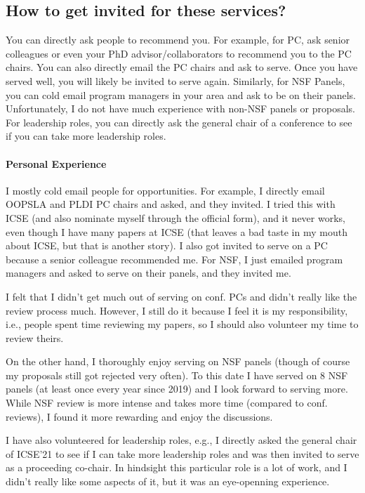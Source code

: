\documentclass[oneside,11pt,dvipsnames]{book}
\begin{document}
\subsection{How to get invited for these services?} 

You can directly ask people to recommend you. For example, for PC, ask senior colleagues or even your PhD advisor/collaborators to recommend you to the PC chairs. You can also directly email the PC chairs and ask to serve.  Once you have served well, you will likely be invited to serve again.  
Similarly, for NSF Panels, you can cold email program managers in your area and ask to be on their panels.  Unfortunately, I do not have much experience with non-NSF panels or proposals. For leadership roles, you can directly ask the general chair of a conference to see if you can take more leadership roles.

\paragraph{Personal Experience} I mostly cold email people for opportunities. For example, I directly email OOPSLA and PLDI PC chairs and asked, and they invited. I tried this with ICSE (and also nominate myself through the official form), and it never works, even though I have many papers at ICSE (that leaves a bad taste in my mouth about ICSE, but that is another story).  I also got invited to serve on a PC because a senior colleague recommended me.
For NSF, I just emailed program managers and asked to serve on their panels, and they invited me.


I felt that I didn't get much out of serving on conf. PCs and didn't really like the review process much. 
However, I still do it because I feel it is my responsibility, i.e., people spent time reviewing my papers, so I should also volunteer my time to review theirs.

On the other hand, I thoroughly enjoy serving on NSF panels (though of course my proposals still got rejected very often). To this date I have served on 8 NSF panels (at least once every year since 2019) and I look forward to serving more. While NSF review is more intense and takes more time (compared to conf. reviews), I found it more rewarding and enjoy the discussions. 


I have also volunteered for leadership roles, e.g., I directly asked the general chair of ICSE'21 to see if I can take more leadership roles and was then invited to serve as a proceeding co-chair. In hindsight this particular role is a lot of work, and I didn't really like some aspects of it, but it was an eye-openning experience. 
\end{document}
